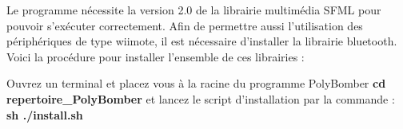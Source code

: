 
	Le programme nécessite la version 2.0 de la librairie multimédia SFML pour pouvoir s'exécuter correctement. Afin de permettre aussi l'utilisation des périphériques de type wiimote, il est nécessaire d'installer la librairie bluetooth. Voici la procédure pour installer l'ensemble de ces librairies :
	
	

Ouvrez un terminal et placez vous à la racine du programme PolyBomber \textbf{cd repertoire\_PolyBomber} et lancez le script d'installation par la commande : \textbf{sh ./install.sh}
